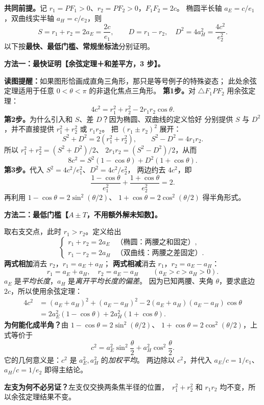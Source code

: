 \clearpage
\begin{proofbox}
\textbf{共同前提。}记 $r_1=PF_1>0$、$r_2=PF_2>0$，$F_1F_2=2c$。
椭圆半长轴 $a_E=c/e_1$，双曲线实半轴 $a_H=c/e_2$，则
\[
 S=r_1+r_2=2a_E=\frac{2c}{e_1},\qquad
 D=r_1-r_2,\quad D^2=4a_H^2=\frac{4c^2}{e_2^2}.
\]
以下按\textbf{最快、最低门槛、常规坐标法}分别证明。

\medskip
\textbf{方法一：最快证明【余弦定理＋和差平方，3 步】。}


\begin{center}

\end{center}
\textbf{读图提醒：}如果图形恰画成直角三角形，那只是等号例子的特殊姿态；
此处余弦定理适用于任意 $0<\theta<\pi$ 的非退化焦点三角形。
\textbf{第1步。}对 $\triangle F_1PF_2$ 用余弦定理：
\[
 4c^2=r_1^2+r_2^2-2r_1r_2\cos\theta.
\]
\textbf{第2步。}为什么引入和 $S$、差 $D$？因为椭圆、双曲线的定义恰好
分别提供 $S$ 与 $D^2$，并不直接提供 $r_1^2+r_2^2$ 或 $r_1r_2$。
把 $(r_1\pm r_2)^2$ 展开：
\[
S^2+D^2=2(r_1^2+r_2^2),\qquad
S^2-D^2=4r_1r_2.
\]
所以 $r_1^2+r_2^2=(S^2+D^2)/2$、
$2r_1r_2=(S^2-D^2)/2$，从而
\[
 8c^2=S^2(1-\cos\theta)+D^2(1+\cos\theta).
\]
\textbf{第3步。}代入 $S^2=4c^2/e_1^2$、$D^2=4c^2/e_2^2$，
两边约去 $4c^2$，即
\[
 \boxed{\frac{1-\cos\theta}{e_1^2}+
 \frac{1+\cos\theta}{e_2^2}=2}.
\]
再利用 $1-\cos\theta=2\sin^2(\theta/2)$、
$1+\cos\theta=2\cos^2(\theta/2)$ 得半角形式。
\end{proofbox}

\clearpage
\begin{proofbox}
\textbf{方法二：最低门槛【$A\pm T$，不用额外解未知数】。}


\begin{center}

\end{center}
取右支交点，此时 $r_1>r_2$。定义给出
\[
\begin{cases}
r_1+r_2=2a_E &\text{（椭圆：两腰之和固定）},\\
r_1-r_2=2a_H &\text{（双曲线：两腰之差固定）}.
\end{cases}
\]
\textbf{两式相加}消去 $r_2$，$r_1=a_E+a_H$；
\textbf{两式相减}消去 $r_1$，$r_2=a_E-a_H$：
\[
\boxed{r_1=a_E+a_H,\quad r_2=a_E-a_H}\qquad(a_E>c>a_H>0).
\]
$ a_E$ 是\emph{平均长度}，$a_H$ 是\emph{离开平均长度的偏差}。
因为已知两腰、夹角 $\theta$，要求底边 $2c$，所以使用余弦定理：
\[
 \begin{aligned}
 4c^2
 &= (a_E+a_H)^2+(a_E-a_H)^2
   -2(a_E+a_H)(a_E-a_H)\cos\theta\\
 &=2a_E^2(1-\cos\theta)+2a_H^2(1+\cos\theta).
 \end{aligned}
\]
\textbf{为何能化成半角？}由 $1-\cos\theta=2\sin^2(\theta/2)$、
$1+\cos\theta=2\cos^2(\theta/2)$，上式等价于
\[
c^2=a_E^2\sin^2\frac\theta2+a_H^2\cos^2\frac\theta2.
\]
它的几何意义是：$c^2$ 是 $a_E^2,a_H^2$ 的\emph{加权平均}。
两边除以 $c^2$，并代入 $a_E/c=1/e_1$、$a_H/c=1/e_2$ 即得主结论。

\textbf{左支为何不必另证？}左支仅交换两条焦半径的位置，
$\,r_1^2+r_2^2$ 和 $r_1r_2$ 均不变，所以余弦定理结果不变。
\end{proofbox}

